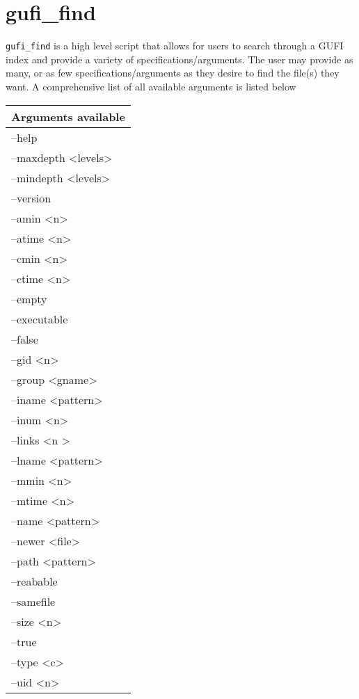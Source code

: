 \section{gufi\_find}
\texttt{gufi\_find} is a high level script that allows for users to search through a GUFI index and provide a variety of specifications/arguments. The user may provide as many, or as few specifications/arguments as they desire to find the file(s) they want. A comprehensive list of all available arguments is listed below 

\begin{table} [h]
\centering
\begin{tabular}{l}
Arguments available \\\hline
--help\\
--maxdepth \textless levels\textgreater\\
--mindepth \textless levels\textgreater\\
--version\\
--amin \textless n\textgreater\\
--atime \textless n\textgreater\\
--cmin \textless n\textgreater\\
--ctime \textless n\textgreater\\
--empty\\
--executable\\
--false\\
--gid \textless n\textgreater\\
--group \textless gname\textgreater\\
--iname \textless pattern\textgreater\\ 
--inum \textless n\textgreater\\
--links \textless n \textgreater\\
--lname \textless pattern\textgreater\\
--mmin \textless n\textgreater\\
--mtime \textless n\textgreater\\
--name \textless pattern\textgreater\\
--newer \textless file\textgreater\\
--path \textless pattern\textgreater\\
--reabable\\
--samefile\\
--size \textless n\textgreater\\
--true\\
--type \textless c\textgreater\\
--uid \textless n\textgreater\\

\end{tabular}
\end{table}
